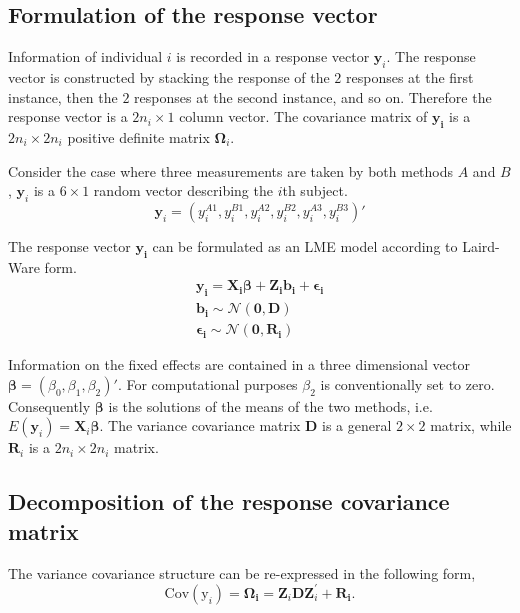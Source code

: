 \documentclass[12pt, a4paper]{report}
\theoremstyle{plain}
\theoremstyle{definition}
\theoremstyle{remark}
\begin{document}
\subsection{Formulation of the response vector}
Information of individual $i$ is recorded in a response vector $\boldsymbol{y}_{i}$. The response vector is constructed by stacking the response of the $2$ responses at the first instance, then the $2$ responses at the second instance, and so on. Therefore the response vector is a $2n_{i} \times 1$ column vector.
The covariance matrix of $\boldsymbol{y_{i}}$ is a $2n_{i} \times 2n_{i}$ positive definite matrix $\boldsymbol{\Omega}_{i}$.

Consider the case where three measurements are taken by both methods $A$ and $B$, $\boldsymbol{y}_{i}$ is a $6 \times 1$ random vector describing the $i$th subject.
\[
\boldsymbol{y}_{i} = (y_{i}^{A1},y_{i}^{B1},y_{i}^{A2},y_{i}^{B2},y_{i}^{A3},y_{i}^{B3}) \prime
\]

The response vector $\boldsymbol{y_{i}}$ can be formulated as an LME model according to Laird-Ware form.
\begin{eqnarray*}
	\boldsymbol{y_{i}} = \boldsymbol{X_{i}\beta}  + \boldsymbol{Z_{i}b_{i}} + \boldsymbol{\epsilon_{i}}\\
	\boldsymbol{b_{i}} \sim \mathcal{N}(\boldsymbol{0,D})\\
	\boldsymbol{\epsilon_{i}} \sim \mathcal{N}(\boldsymbol{0,R_{i}})
\end{eqnarray*}

Information on the fixed effects are contained in a three dimensional vector $\boldsymbol{\beta} = (\beta_{0},\beta_{1},\beta_{2})\prime$. For computational purposes $\beta_{2}$ is conventionally set to zero. Consequently $\boldsymbol{\beta}$ is the solutions of the means of the two methods, i.e. $E(\boldsymbol{y}_{i})  = \boldsymbol{X}_{i}\boldsymbol{\beta}$. The variance covariance matrix $\boldsymbol{D}$ is a general $2 \times 2$ matrix, while $\boldsymbol{R}_{i}$ is a $2n_{i} \times 2n_{i}$ matrix.

\subsection{Decomposition of the response covariance matrix}

The variance covariance structure can be re-expressed in the following form,
\[
\mbox{Cov}(\mbox{y}_{i}) = \boldsymbol{\Omega_{i}} = \boldsymbol{Z}_{i}\boldsymbol{D}\boldsymbol{Z}_{i}^\prime + \boldsymbol{R_{i}}.
\]
\end{document}
